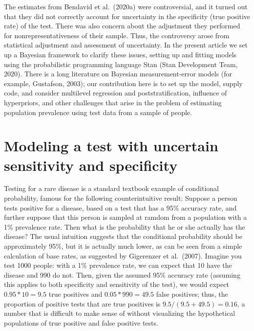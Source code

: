 \documentclass[11pt]{article}
\begin{document}
The estimates from Bendavid et al.\ (2020a) were controversial, and it turned out that they did not correctly account for uncertainty in the specificity (true positive rate) of the test.  There was also concern about the adjustment they performed for nonrepresentativeness of their sample.  Thus, the controversy arose from statistical adjustment and assessment of uncertainty.  In the present article we set up a Bayesian framework to clarify these issues, setting up and fitting models using the probabilistic programming language Stan (Stan Development Team, 2020).  There is a long literature on Bayesian measurement-error models (for example, Gustafson, 2003); our contribution here is to set up the model, supply code, and consider multilevel regression and poststratification, influence of hyperpriors, and other challenges that arise in the problem of estimating population prevalence using test data from a sample of people.


\section{Modeling a test with uncertain sensitivity and specificity}\label{model1}

Testing for a rare disease is a standard textbook example of conditional probability, famous for the following counterintuitive result:  Suppose a person tests positive for a disease, based on a test that has a 95\% accuracy rate, and further suppose that this person is sampled at ramdom from a population with a 1\% prevalence rate.  Then what is the probability that he or she actually has the disease? The usual intuition suggests that the conditional probability should be approximately 95\%, but it is actually much lower, as can be seen from a simple calculation of base rates, as suggested by Gigerenzer et al.\ (2007).  Imagine you test 1000  people:  with a 1\% prevalence rate, we can expect that 10 have the disease and 990 do not.  Then, given the assumed 95\% accuracy rate (assuming this applies to both specificity and sensitivity of the test), we would expect $0.95*10=9.5$ true positives and $0.05*990 =  49.5$ false positives; thus, the proportion of positive tests that are true positives is $9.5/(9.5+49.5) = 0.16$, a number that is difficult to make sense of without visualizing the hypothetical populations of true positive and false positive tests.
\end{document}
